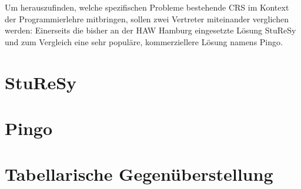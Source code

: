 Um herauszufinden, welche spezifischen Probleme bestehende CRS im Kontext der Programmierlehre mitbringen, sollen zwei Vertreter miteinander verglichen werden: Einerseits die bisher an der HAW Hamburg eingesetzte Lösung StuReSy und zum Vergleich eine sehr populäre, kommerziellere Lösung namens Pingo.

\section{StuReSy}
\label{chap:sturesy}


\newpage
\section{Pingo}
\label{chap:pingo}

%
\section{Tabellarische Gegenüberstellung}
\label{chap:tabelle}
